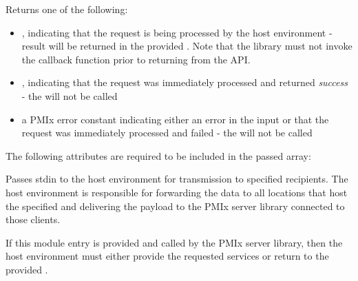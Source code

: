 Returns one of the following:

\begin{itemize}
    \item {}, indicating that the request is being processed by the host environment - result will be returned in the provided . Note that the library must not invoke the callback function prior to returning from the \ac{API}.
    \item {}, indicating that the request was immediately processed and returned \textit{success} - the  will not be called
    \item a PMIx error constant indicating either an error in the input or that the request was immediately processed and failed - the  will not be called
\end{itemize}

\reqattrstart
The following attributes are required to be included in the passed  array:


\reqattrend

\descr

Passes stdin to the host environment for transmission to specified recipients. The host environment is responsible for forwarding the data to all locations that host the specified  and delivering the payload to the \ac{PMIx} server library connected to those clients.

\advicermstart
If this module entry is provided and called by the \ac{PMIx} server library, then the host environment must either provide the requested services or return  to the provided .
\advicermend

